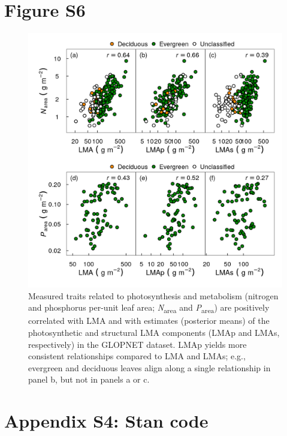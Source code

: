 \documentclass[
  12pt,
  letterpaper,
  DIV=11,
  numbers=noendperiod]{scrartcl}
\begin{document}
\newpage

\hypertarget{figure-s6}{%
\section{Figure S6}\label{figure-s6}}

\begin{figure}

{\centering \includegraphics{../figs/gl_point_np2.png}

}

\caption{\label{fig-glnp}Measured traits related to photosynthesis and
metabolism (nitrogen and phosphorus per-unit leaf area;
\emph{N}\textsubscript{area} and \emph{P}\textsubscript{area}) are
positively correlated with LMA and with estimates (posterior means) of
the photosynthetic and structural LMA components (LMAp and LMAs,
respectively) in the GLOPNET dataset. LMAp yields more consistent
relationships compared to LMA and LMAs; e.g., evergreen and deciduous
leaves align along a single relationship in panel b, but not in panels a
or c.}

\end{figure}

\hypertarget{appendix-s4-stan-code}{%
\section{Appendix S4: Stan code}\label{appendix-s4-stan-code}}
\end{document}
